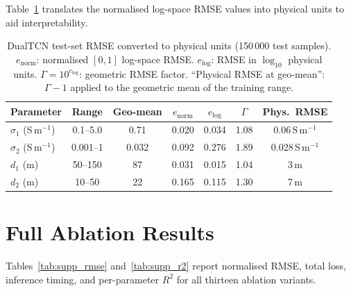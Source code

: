 \documentclass[journal]{IEEEtran}
\begin{document}
Table~\ref{tab:supp_phys} translates the normalised log-space RMSE
values into physical units to aid interpretability.

\begin{table}[t]
  \centering
  \footnotesize
  \caption{DualTCN test-set RMSE converted to physical units
  (150\,000 test samples).
  $e_\mathrm{norm}$: normalised $[0,1]$ log-space RMSE.
  $e_\mathrm{log}$: RMSE in $\log_{10}$ physical units.
  $\Gamma = 10^{e_\mathrm{log}}$: geometric RMSE factor.
  ``Physical RMSE at geo-mean'': $\Gamma - 1$ applied to the
  geometric mean of the training range.}
  \label{tab:supp_phys}
  \begin{tabular}{lcccccc}
    \toprule
    Parameter & Range & Geo-mean & $e_\mathrm{norm}$ & $e_\mathrm{log}$ & $\Gamma$ & Phys.\ RMSE \\
    \midrule
    $\sigma_1$ (S\,m$^{-1}$) & 0.1--5.0 & 0.71 & 0.020 & 0.034 & 1.08 & 0.06\,S\,m$^{-1}$ \\
    $\sigma_2$ (S\,m$^{-1}$) & 0.001--1 & 0.032 & 0.092 & 0.276 & 1.89 & 0.028\,S\,m$^{-1}$ \\
    $d_1$ (m)                & 50--150 & 87 & 0.031 & 0.015 & 1.04 & 3\,m \\
    $d_2$ (m)                & 10--50  & 22 & 0.165 & 0.115 & 1.30 & 7\,m \\
    \bottomrule
  \end{tabular}
\end{table}


\section{Full Ablation Results}
\label{sec:supp_ablation}

Tables~\ref{tab:supp_rmse} and~\ref{tab:supp_r2} report normalised
RMSE, total loss, inference timing, and per-parameter $R^2$ for all
thirteen ablation variants.
\end{document}

